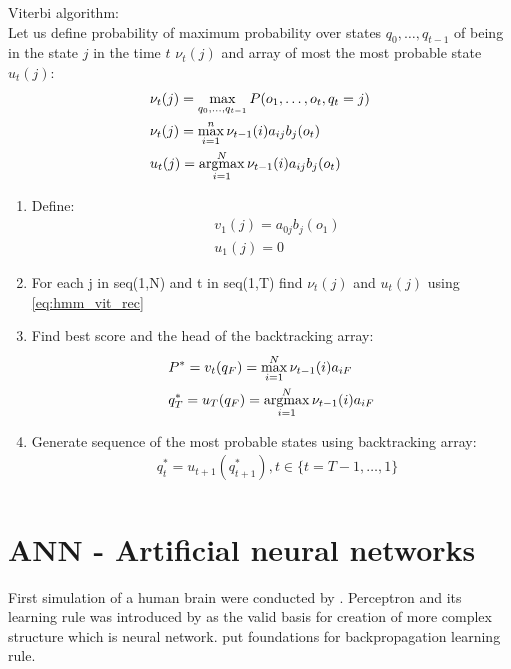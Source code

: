 \begin{algorithm} Viterbi algorithm: \\
	Let us define probability of maximum probability over states $q_0,\ldots,q_{t-1}$ of being in the state $j$ in the time $t$ $\nu_t(j)$ and array of most the most probable state $u_t(j)$:
	\begin{align}
		&\nu_t(j)=\max\limits_{q_0,\ldots,q_{t-1}} P(o_1,\ldots,o_t,q_t=j) \\
		\label{eq:hmm_vit_rec}
		&\nu_t(j)=\max\limits_{i=1}^{n} \nu_{t-1}(i)a_{ij}b_j(o_t) \\
		&u_t(j)=\operatorname*{argmax}\limits_{i=1}^{N} \nu_{t-1}(i)a_{ij}b_j(o_t)
	\end{align}

\begin{enumerate}
	\item Define: \\
		\begin{align}
			& v_1(j)=a_{0j}b_j(o_1) \\
			& u_1(j)=0
		\end{align}
	\item For each j in seq(1,N) and t in seq(1,T) find $\nu_t(j)$ and $u_t(j)$ using \eqref{eq:hmm_vit_rec} 
	\item Find best score and the head of the backtracking array:
		\begin{align}
			& P^{*}=v_t(q_F)=\max\limits_{i=1}^{N} \nu_{t-1}(i)a_{iF} \\
			& q_T^*=u_T(q_F)=\operatorname*{argmax}\limits_{i=1}^{N} \nu_{t-1}(i)a_{iF} 
		\end{align}
	\item Generate sequence of the most probable states using backtracking array:
		\begin{align}
			& q_t^*=u_{t+1}(q_{t+1}^*), t \in \{t=T-1,\ldots,1\} \\
		\end{align}
	
\end{enumerate}
	
\end{algorithm}



\section{ANN - Artificial neural networks}
First simulation of a human brain were conducted by \textcite{mcculloch}. Perceptron and its learning rule was introduced by \textcite{rosenblatt} as the valid basis for creation of more complex structure which is neural network. \textcite{hebb1} put foundations for backpropagation learning rule.

